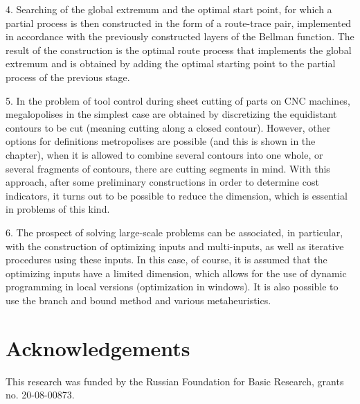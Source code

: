\documentclass[numbers,sort&compress]{IntechOpen-Book}%
\begin{document}
4. Searching of the global extremum and the optimal start point, for which a partial process is then constructed in the form of a route-trace pair, implemented in accordance with the previously constructed layers of the Bellman function. The result of the construction is the optimal route process that implements the global extremum and is obtained by adding the optimal starting point to the partial process of the previous stage.

5. In the problem of tool control during sheet cutting of parts on CNC machines, megalopolises in the simplest case are obtained by discretizing the equidistant contours to be cut (meaning cutting along a closed contour). However, other options for definitions metropolises are possible (and this is shown in the chapter), when it is allowed to combine several contours into one whole, or several fragments of contours, there are cutting segments in mind. With this approach, after some preliminary constructions in order to determine cost indicators, it turns out to be possible to reduce the dimension, which is essential in problems of this kind.

6. The prospect of solving large-scale problems can be associated, in particular, with the construction of optimizing inputs and multi-inputs, as well as iterative procedures using these inputs. In this case, of course, it is assumed that the optimizing inputs have a limited dimension, which allows for the use of dynamic programming in local versions (optimization in windows). It is also possible to use the branch and bound method and various metaheuristics.

\section{Acknowledgements}
\label{sec:7} 
This research was funded by the Russian Foundation for Basic Research, grants no. 20-08-00873.
\begin{backmatter}
\begin{authordetails}
\author{A. Petunin$^{1,2}$,
  A. Chentsov$^{^2}$
  and
  P. Chentsov$^2$
}
\address[1]{Ural Federal University, Ekaterinburg, Russia}
\address[2]{N.N. Krasovskii Institute of Mathematics and Mechanics, Ekaterinburg, Russia}

\address{*Address all correspondence to: 	a.a.petunin@urfu.ru}

\end{authordetails}


\end{backmatter}
\end{document}
